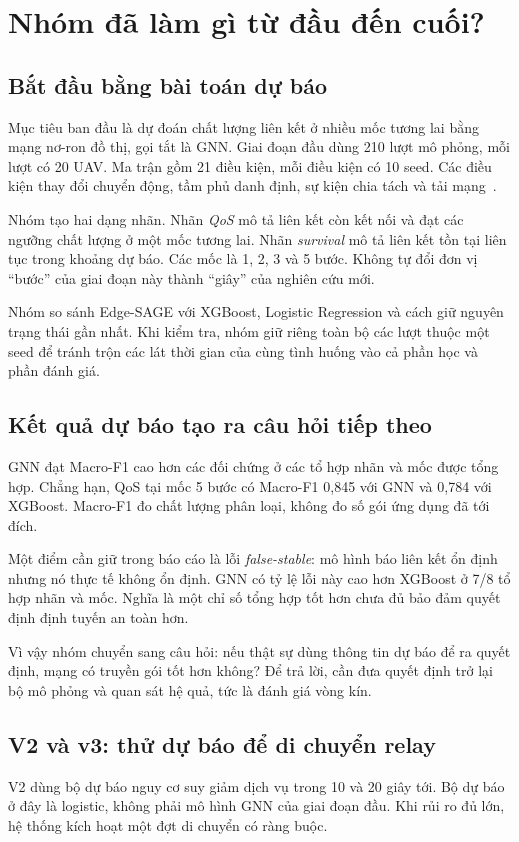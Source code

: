 \chapter{Nhóm đã làm gì từ đầu đến cuối?}
\section{Bắt đầu bằng bài toán dự báo}
Mục tiêu ban đầu là dự đoán chất lượng liên kết ở nhiều mốc tương lai bằng mạng nơ-ron đồ thị, gọi tắt là GNN. Giai đoạn đầu dùng 210 lượt mô phỏng, mỗi lượt có 20 UAV. Ma trận gồm 21 điều kiện, mỗi điều kiện có 10 seed. Các điều kiện thay đổi chuyển động, tầm phủ danh định, sự kiện chia tách và tải mạng~\cite{report}.

Nhóm tạo hai dạng nhãn. Nhãn \emph{QoS} mô tả liên kết còn kết nối và đạt các ngưỡng chất lượng ở một mốc tương lai. Nhãn \emph{survival} mô tả liên kết tồn tại liên tục trong khoảng dự báo. Các mốc là 1, 2, 3 và 5 bước. Không tự đổi đơn vị ``bước'' của giai đoạn này thành ``giây'' của nghiên cứu mới.

Nhóm so sánh Edge-SAGE với XGBoost, Logistic Regression và cách giữ nguyên trạng thái gần nhất. Khi kiểm tra, nhóm giữ riêng toàn bộ các lượt thuộc một seed để tránh trộn các lát thời gian của cùng tình huống vào cả phần học và phần đánh giá.

\section{Kết quả dự báo tạo ra câu hỏi tiếp theo}
GNN đạt Macro-F1 cao hơn các đối chứng ở các tổ hợp nhãn và mốc được tổng hợp. Chẳng hạn, QoS tại mốc 5 bước có Macro-F1 0,845 với GNN và 0,784 với XGBoost. Macro-F1 đo chất lượng phân loại, không đo số gói ứng dụng đã tới đích.

Một điểm cần giữ trong báo cáo là lỗi \emph{false-stable}: mô hình báo liên kết ổn định nhưng nó thực tế không ổn định. GNN có tỷ lệ lỗi này cao hơn XGBoost ở 7/8 tổ hợp nhãn và mốc. Nghĩa là một chỉ số tổng hợp tốt hơn chưa đủ bảo đảm quyết định định tuyến an toàn hơn.

Vì vậy nhóm chuyển sang câu hỏi: nếu thật sự dùng thông tin dự báo để ra quyết định, mạng có truyền gói tốt hơn không? Để trả lời, cần đưa quyết định trở lại bộ mô phỏng và quan sát hệ quả, tức là đánh giá vòng kín.

\section{V2 và v3: thử dự báo để di chuyển relay}
V2 dùng bộ dự báo nguy cơ suy giảm dịch vụ trong 10 và 20 giây tới. Bộ dự báo ở đây là logistic, không phải mô hình GNN của giai đoạn đầu. Khi rủi ro đủ lớn, hệ thống kích hoạt một đợt di chuyển có ràng buộc.

